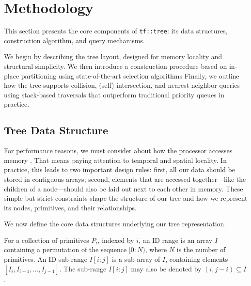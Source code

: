 \section{Methodology}

This section presents the core components of \texttt{tf::tree}:
its data structures, construction algorithm, and query mechanisms.

We begin by describing the tree layout, designed for memory locality
and structural simplicity. We then introduce a construction procedure
based on in-place partitioning using state-of-the-art selection algorithms
Finally, we outline how the tree supports collision, (self) intersection,
and nearest-neighbor queries using stack-based traversals that
outperform traditional priority queues in practice.


\subsection{Tree Data Structure}

For performance reasons, we must consider about how the processor accesses memory \cite{data-oriented-design}.
That means paying attention to temporal and spatial locality. In practice, this leads to
two important design rules: first, all our data should be stored in contiguous arrays;
second, elements that are accessed together—like the children of a node—should also be
laid out next to each other in memory.
These simple but strict constraints shape the structure of our tree and how we represent
its nodes, primitives, and their relationships.


We now define the core data structures underlying our tree representation.


\begin{definition}[ID range]\label{def:ids}
	For a collection of primitives $P_i$, indexed by $i$,
	an ID range is an array $I$ containing a permutation
	of the sequence $[0 : N)$, where $N$ is the number of
	primitives. An ID sub-range $I[i:j]$ is a sub-array of
	$I$, containing elements $[I_i, I_{i+1}, \dots, I_{j-1}]$.
	The sub-range $I[i:j]$ may also be denoted by $(i, j - i)\subseteq I$.
\end{definition}


